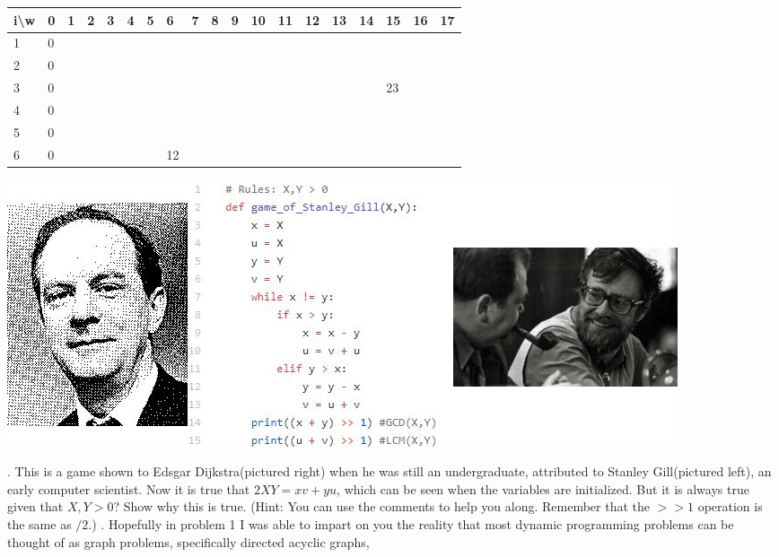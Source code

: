 \documentclass[12pt]{article}
\begin{document}
\FloatBarrier
\begin{table}[]
    \begin{tabular}{|l|l|l|l|l|l|l|l|l|l|l|l|l|l|l|l|l|l|l|}
    \hline
    i\textbackslash{}w & 0 & 1 & 2 & 3 & 4 & 5 & 6  & 7 & 8 & 9 & 10 & 11 & 12 & 13 & 14 & 15 & 16 & 17 \\ \hline
    1                  & 0 &   &   &   &   &   &    &   &   &   &    &    &    &    &    &    &    &    \\ \hline
    2                  & 0 &   &   &   &   &   &    &   &   &   &    &    &    &    &    &    &    &    \\ \hline
    3                  & 0 &   &   &   &   &   &    &   &   &   &    &    &    &    &    & 23 &    &    \\ \hline
    4                  & 0 &   &   &   &   &   &    &   &   &   &    &    &    &    &    &    &    &    \\ \hline
    5                  & 0 &   &   &   &   &   &    &   &   &   &    &    &    &    &    &    &    &    \\ \hline
    6                  & 0 &   &   &   &   &   & 12 &   &   &   &    &    &    &    &    &    &    &    \\ \hline
    \end{tabular}
    \end{table}
    \FloatBarrier
\newpage
\centerline{\includegraphics[scale = 2]{comb.jpg}}
. This is a game shown to Edsgar Dijkstra(pictured right) when he was still an undergraduate, attributed to Stanley Gill(pictured left), an early computer scientist. Now it is true that $2XY = xv+yu$, which can be seen when the variables are initialized. But it is always true given that $X,Y > 0$? Show why this is true. (Hint: You can use the comments to help you along. Remember that the $>> 1 $ operation is the same as $ / 2$.)
\newpage
{}. Hopefully in problem 1 I was able to impart on you the reality that most dynamic 
programming problems can be thought of as graph problems, specifically directed acyclic graphs, 
\end{document}
